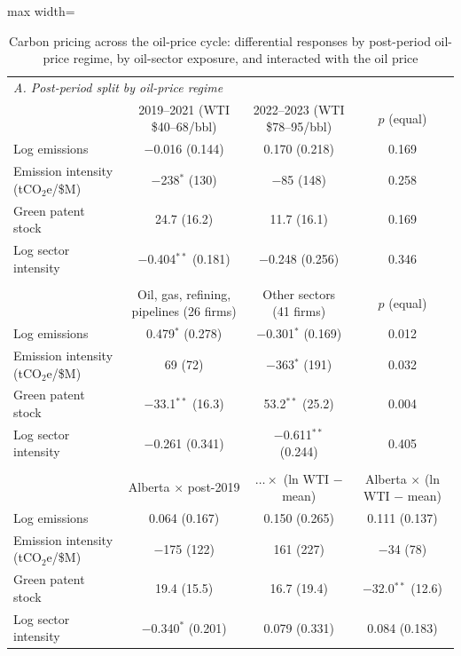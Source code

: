 \begin{table}[htbp]\centering\footnotesize
\caption{Carbon pricing across the oil-price cycle: differential responses by post-period oil-price regime, by oil-sector exposure, and interacted with the oil price}
\label{tab:oil}
\begin{adjustbox}{max width=\textwidth}
\begin{tabular}{lccc}
\toprule
\multicolumn{4}{l}{\textit{A. Post-period split by oil-price regime}} \\
 & 2019--2021 (WTI \$40--68/bbl) & 2022--2023 (WTI \$78--95/bbl) & $p$ (equal) \\ \midrule
Log emissions & $-$0.016 (0.144) & 0.170 (0.218) & 0.169 \\
Emission intensity (tCO$_2$e/\$M) & $-$238$^{*}$ (130) & $-$85 (148) & 0.258 \\
Green patent stock & 24.7 (16.2) & 11.7 (16.1) & 0.169 \\
Log sector intensity & $-$0.404$^{**}$ (0.181) & $-$0.248 (0.256) & 0.346 \\
\addlinespace
\multicolumn{4}{l}{\textit{B. Oil-exposed versus other sectors}} \\
 & Oil, gas, refining, pipelines (26 firms) & Other sectors (41 firms) & $p$ (equal) \\ \midrule
Log emissions & 0.479$^{*}$ (0.278) & $-$0.301$^{*}$ (0.169) & 0.012 \\
Emission intensity (tCO$_2$e/\$M) & 69 (72) & $-$363$^{*}$ (191) & 0.032 \\
Green patent stock & $-$33.1$^{**}$ (16.3) & 53.2$^{**}$ (25.2) & 0.004 \\
Log sector intensity & $-$0.261 (0.341) & $-$0.611$^{**}$ (0.244) & 0.405 \\
\addlinespace
\multicolumn{4}{l}{\textit{C. Treatment effect interacted with the oil price}} \\
 & Alberta $\times$ post-2019 & $\ldots\times$ (ln WTI $-$ mean) & Alberta $\times$ (ln WTI $-$ mean) \\ \midrule
Log emissions & 0.064 (0.167) & 0.150 (0.265) & 0.111 (0.137) \\
Emission intensity (tCO$_2$e/\$M) & $-$175 (122) & 161 (227) & $-$34 (78) \\
Green patent stock & 19.4 (15.5) & 16.7 (19.4) & $-$32.0$^{**}$ (12.6) \\
Log sector intensity & $-$0.340$^{*}$ (0.201) & 0.079 (0.331) & 0.084 (0.183) \\
\bottomrule
\end{tabular}

\end{adjustbox}
\end{table}
